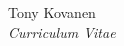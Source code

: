 \documentclass[10pt]{article}
\begin{document}
\begin{cv}{Tony Kovanen\\{\large \itshape Curriculum Vitae}}
%	
	



\end{cv}
\end{document}
